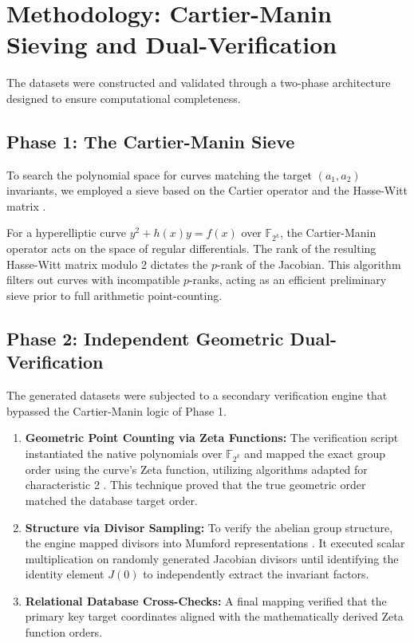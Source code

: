 \documentclass[12pt]{article}
\begin{document}
\section{Methodology: Cartier-Manin Sieving and Dual-Verification}
The datasets were constructed and validated through a two-phase architecture designed to ensure computational completeness.

\subsection{Phase 1: The Cartier-Manin Sieve}
To search the polynomial space for curves matching the target $(a_1, a_2)$ invariants, we employed a sieve based on the Cartier operator \cite{Cartier1958} and the Hasse-Witt matrix \cite{Manin1963}. 

For a hyperelliptic curve $y^2 + h(x)y = f(x)$ over $\mathbb{F}_{2^k}$, the Cartier-Manin operator acts on the space of regular differentials. The rank of the resulting Hasse-Witt matrix modulo 2 dictates the $p$-rank of the Jacobian. This algorithm filters out curves with incompatible $p$-ranks, acting as an efficient preliminary sieve prior to full arithmetic point-counting.

\subsection{Phase 2: Independent Geometric Dual-Verification}
The generated datasets were subjected to a secondary verification engine that bypassed the Cartier-Manin logic of Phase 1.

\begin{enumerate}
    \item \textbf{Geometric Point Counting via Zeta Functions:} The verification script instantiated the native polynomials over $\mathbb{F}_{2^k}$ and mapped the exact group order using the curve's Zeta function, utilizing algorithms adapted for characteristic 2 \cite{Denef2006}. This technique proved that the true geometric order matched the database target order.
    \item \textbf{Structure via Divisor Sampling:} To verify the abelian group structure, the engine mapped divisors into Mumford representations \cite{Cantor1987}. It executed scalar multiplication on randomly generated Jacobian divisors until identifying the identity element $J(0)$ \cite{Sutherland2007} to independently extract the invariant factors.
    \item \textbf{Relational Database Cross-Checks:} A final mapping verified that the primary key target coordinates aligned with the mathematically derived Zeta function orders.
\end{enumerate}
\end{document}
